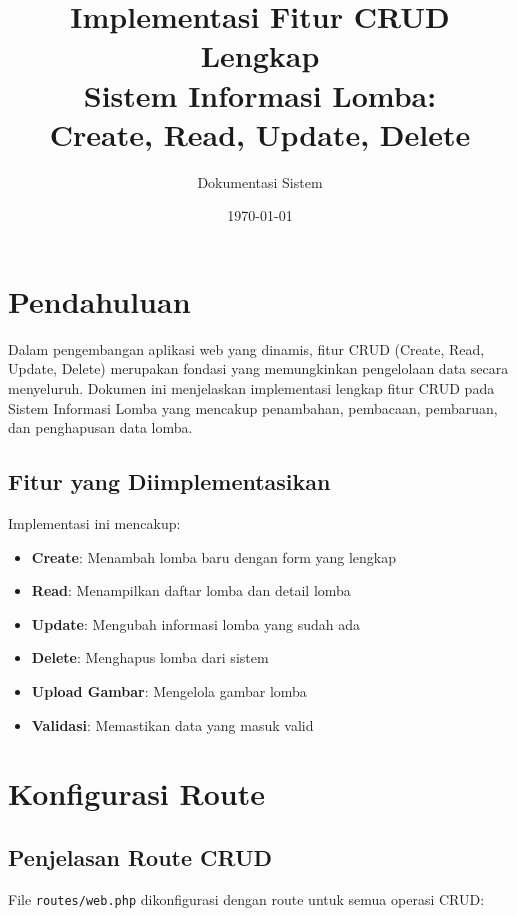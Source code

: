 \documentclass[12pt,a4paper]{article}
\title{\textbf{Implementasi Fitur CRUD Lengkap \\ Sistem Informasi Lomba: \\ Create, Read, Update, Delete}}
\author{Dokumentasi Sistem}
\date{\today}
\begin{document}
\maketitle
\tableofcontents
\newpage

\section{Pendahuluan}

Dalam pengembangan aplikasi web yang dinamis, fitur CRUD (Create, Read, Update, Delete) merupakan fondasi yang memungkinkan pengelolaan data secara menyeluruh. Dokumen ini menjelaskan implementasi lengkap fitur CRUD pada Sistem Informasi Lomba yang mencakup penambahan, pembacaan, pembaruan, dan penghapusan data lomba.

\subsection{Fitur yang Diimplementasikan}

Implementasi ini mencakup:
\begin{itemize}
    \item \textbf{Create}: Menambah lomba baru dengan form yang lengkap
    \item \textbf{Read}: Menampilkan daftar lomba dan detail lomba
    \item \textbf{Update}: Mengubah informasi lomba yang sudah ada
    \item \textbf{Delete}: Menghapus lomba dari sistem
    \item \textbf{Upload Gambar}: Mengelola gambar lomba
    \item \textbf{Validasi}: Memastikan data yang masuk valid
\end{itemize}

\section{Konfigurasi Route}

\subsection{Penjelasan Route CRUD}

File \texttt{routes/web.php} dikonfigurasi dengan route untuk semua operasi CRUD:
\end{document}
